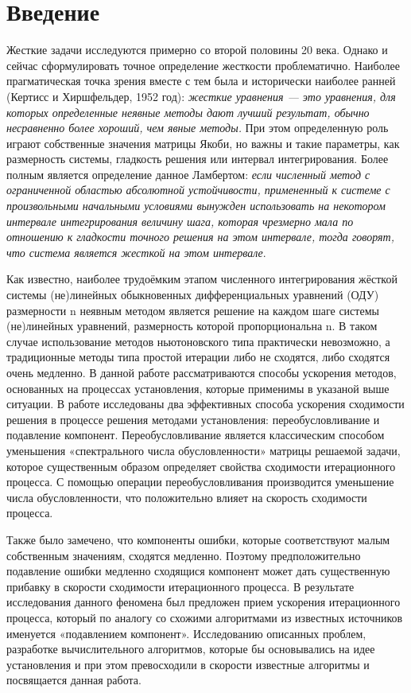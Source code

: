 \documentclass[a4paper,14pt]{extreport}
\begin{document}
  {
    \renewcommand{\contentsname}{Содержание}
    \tableofcontents
  }

  \chapter*{Введение}
  Жесткие задачи исследуются примерно со второй половины 20 века. Однако и сейчас сформулировать точное определение жесткости проблематично. Наиболее прагматическая точка зрения вместе с тем была и исторически наиболее ранней (Кертисс и Хиршфельдер, 1952 год): \textit{жесткие уравнения — это уравнения, для которых определенные неявные методы дают лучший результат, обычно несравненно более хороший, чем явные методы.} При этом определенную роль играют собственные значения матрицы Якоби, но важны и такие параметры, как размерность системы, гладкость решения или интервал интегрирования. 
Более полным является определение данное Ламбертом: \textit{если численный метод с ограниченной областью абсолютной устойчивости, примененный к системе с произвольными начальными условиями вынужден использовать на некотором интервале интегрирования величину шага, которая чрезмерно мала по отношению к гладкости точного решения на этом интервале, тогда говорят, что система является жесткой на этом интервале}\cite{hairer}.


Как известно, наиболее трудоёмким этапом численного интегрирования жёсткой системы (не)линейных обыкновенных дифференциальных уравнений (ОДУ) размерности n неявным методом является решение на каждом шаге системы (не)линейных уравнений, размерность которой пропорциональна n. В таком случае использование методов ньютоновского типа практически невозможно, а традиционные методы типа простой итерации либо не сходятся, либо сходятся очень медленно. В данной работе рассматриваются способы ускорения методов, основанных на процессах установления, которые применимы в указаной выше ситуации.
В работе исследованы два эффективных способа ускорения сходимости решения в процессе решения методами установления: переобусловливание и подавление компонент. Переобусловливание является классическим способом уменьшения «спектрального числа обусловленности» матрицы решаемой задачи, которое существенным образом определяет свойства сходимости итерационного процесса. С помощью операции переобусловливания производится уменьшение числа обусловленности, что положительно влияет на скорость сходимости процесса.


Также было замечено, что компоненты ошибки, которые соответствуют малым собственным значениям, сходятся медленно. Поэтому предположительно подавление ошибки медленно сходящися компонент может дать существенную прибавку в скорости сходимости итерационного процесса. В результате исследования данного феномена был предложен прием ускорения итерационного процесса, который  по аналогу со схожими алгоритмами из известных источников именуется «подавлением компонент».
Исследованию описанных проблем, разработке вычислительного алгоритмов, которые бы основывались на идее установления и при этом превосходили в скорости известные алгоритмы и посвящается данная работа.
  \label{c:intro}
\end{document}
